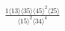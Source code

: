 \documentclass[varwidth, border=5pt]{standalone}
\begin{document}
\begin{my}
$\begin{gathered}
\scriptscriptstyle\frac{1⟨13⟩⟨35⟩⟨45⟩^2⟨25⟩}{⟨15⟩^2⟨34⟩^4}
\end{gathered}$
\end{my}
\end{document}
